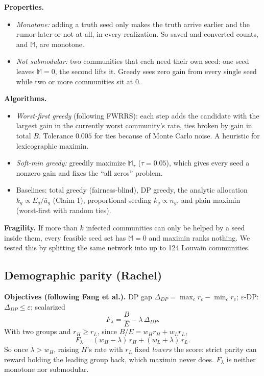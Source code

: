 \documentclass[11pt]{article}
\newcommand{\M}{\mathbb{M}}
\begin{document}
\textbf{Properties.}\label{sec:q2-props}
\begin{itemize}
\item \emph{Monotone:} adding a truth seed only makes the truth arrive earlier and the rumor later or not at all, in every realization. So saved and converted counts, and $\M$, are monotone.
\item \emph{Not submodular:} two communities that each need their own seed: one seed leaves $\M=0$, the second lifts it. Greedy sees zero gain from every single seed while two or more communities sit at $0$.
\end{itemize}

\textbf{Algorithms.}
\begin{itemize}
\item \emph{Worst-first greedy} (following FWRRS): each step adds the candidate with the largest gain in the currently worst community's rate, ties broken by gain in total $B$. Tolerance $0.005$ for ties because of Monte Carlo noise. A heuristic for lexicographic maximin.
\item \emph{Soft-min greedy:} greedily maximize $\M_\tau$ ($\tau=0.05$), which gives every seed a nonzero gain and fixes the ``all zeros'' problem.
\item Baselines: total greedy (fairness-blind), DP greedy, the analytic allocation $k_g\propto E_g/\bar a_g$ (Claim 1), proportional seeding $k_g\propto n_g$, and plain maximin (worst-first with random ties).
\end{itemize}

\textbf{Fragility.} If more than $k$ infected communities can only be helped by a seed inside them, every feasible seed set has $\M=0$ and maximin ranks nothing. We tested this by splitting the same network into up to 124 Louvain communities.

\subsection{Demographic parity (Rachel)}\label{sec:q2-parity}
\textbf{Objectives (following Fang et al.).} DP gap $\Delta_{DP}=\max_c r_c-\min_c r_c$; $\varepsilon$-DP: $\Delta_{DP}\le\varepsilon$; scalarized
\[
F_\lambda=\frac{B}{E}-\lambda\,\Delta_{DP}.
\]
With two groups and $r_H\ge r_L$, since $B/E=w_Hr_H+w_Lr_L$,
\[
F_\lambda=(w_H-\lambda)\,r_H+(w_L+\lambda)\,r_L .
\]
So once $\lambda>w_H$, raising $H$'s rate with $r_L$ fixed \emph{lowers} the score: strict parity can reward holding the leading group back, which maximin never does. $F_\lambda$ is neither monotone nor submodular.
\end{document}
